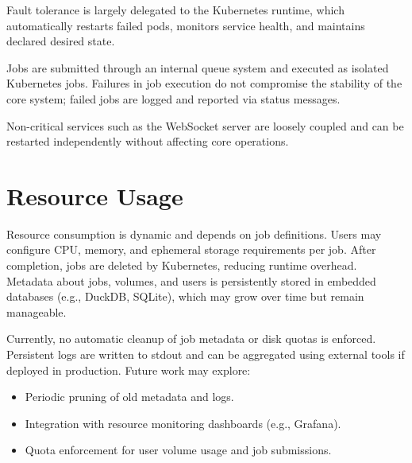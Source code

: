 Fault tolerance is largely delegated to the Kubernetes runtime, which automatically restarts failed pods, monitors service health, and maintains declared desired state.

Jobs are submitted through an internal queue system and executed as isolated Kubernetes jobs. Failures in job execution do not compromise the stability of the core system; failed jobs are logged and reported via status messages.

Non-critical services such as the WebSocket server are loosely coupled and can be restarted independently without affecting core operations.

\section{Resource Usage}

Resource consumption is dynamic and depends on job definitions. Users may configure CPU, memory, and ephemeral storage requirements per job. After completion, jobs are deleted by Kubernetes, reducing runtime overhead. Metadata about jobs, volumes, and users is persistently stored in embedded databases (e.g., DuckDB, SQLite), which may grow over time but remain manageable.

Currently, no automatic cleanup of job metadata or disk quotas is enforced. Persistent logs are written to stdout and can be aggregated using external tools if deployed in production. Future work may explore:

\begin{itemize}
    \item Periodic pruning of old metadata and logs.
    \item Integration with resource monitoring dashboards (e.g., Grafana).
    \item Quota enforcement for user volume usage and job submissions.
\end{itemize}
